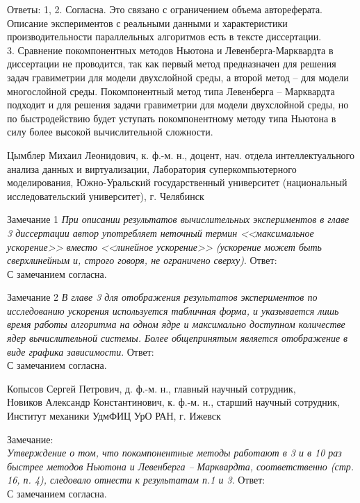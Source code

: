 \documentclass[10pt,pdf, mathserif, hyperref={unicode}]{beamer}
\begin{document}
\begin{frame}{}
	
	Ответы:
	1, 2. Согласна. Это связано с ограничением объема автореферата. Описание экспериментов с реальными данными и характеристики производительности параллельных алгоритмов есть в тексте диссертации.
	\\
	3. Сравнение покомпонентных методов Ньютона и Левенберга-Марквардта в диссертации не проводится, так как первый метод предназначен для решения задач гравиметрии для модели двухслойной среды, а второй метод – для модели многослойной среды. Покомпонентный метод типа Левенберга -- Марквардта подходит и для решения задачи гравиметрии для модели двухслойной среды, но по быстродействию будет уступать покомпонентному методу типа Ньютона в силу более высокой вычислительной сложности.
\end{frame}

\begin{frame}
	Цымблер Михаил Леонидович, к. ф.-м. н., доцент, нач. отдела интеллектуального анализа данных и виртуализации, 
	\vskip 5mm
	Лаборатория суперкомпьютерного моделирования, Южно-Уральский государственный университет (национальный исследовательский университет), г. Челябинск
\end{frame}

\begin{frame}{Замечание 1}
	\textit{При описании результатов вычислительных экспериментов в главе 3 диссертации автор употребляет неточный термин <<максимальное ускорение>> вместо <<линейное ускорение>> (ускорение может быть сверхлинейным и, строго говоря, не ограничено сверху)}.
	\vskip 5mm
	Ответ:\\
	С замечанием согласна.
\end{frame}

\begin{frame}{Замечание 2}
	\textit{В главе 3 для отображения результатов экспериментов по исследованию ускорения используется табличная форма, и указывается лишь время работы алгоритма на одном ядре и максимально доступном количестве ядер вычислительной системы. Более общепринятым является отображение в виде графика зависимости}.
	\vskip 5mm
	Ответ:\\
	С замечанием согласна. 
\end{frame}

\begin{frame}
	Копысов Сергей Петрович, д. ф.-м. н., главный научный сотрудник,\\
	Новиков Александр Константинович, к. ф.-м. н., старший научный сотрудник,\\
	
	\vskip 5mm
	Институт механики УдмФИЦ УрО РАН, г. Ижевск
	
	\vskip 5mm
	Замечание:\\
	\textit{Утверждение о том, что покомпонентные методы работают в 3 и в 10 раз быстрее методов Ньютона и Левенберга -- Марквардта, соответственно (стр. 16, п. 4), следовало отнести к результатам п.1 и 3}.
	\vskip 5mm
	Ответ:\\
	С замечанием согласна.
\end{frame}
\end{document}
